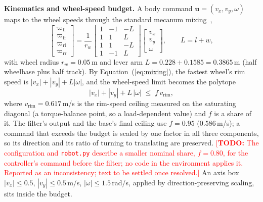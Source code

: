 \documentclass[sensors,article,submit,moreauthors]{Definitions/mdpi}
\newcommand{\todo}[1]{\textcolor{red}{[\textbf{TODO:} #1]}}
\begin{document}
\textbf{Kinematics and wheel-speed budget.} A body command $\mathbf{u} = (v_x, v_y, \omega)$ maps to the wheel speeds through the standard mecanum mixing~\citep{lynch2017modern},
\begin{equation}
\begin{bmatrix}\varpi_{\text{fl}}\\ \varpi_{\text{fr}}\\ \varpi_{\text{rl}}\\ \varpi_{\text{rr}}\end{bmatrix}
= \frac{1}{r_w}
\begin{bmatrix} 1 & -1 & -L\\ 1 & 1 & L\\ 1 & 1 & -L\\ 1 & -1 & L \end{bmatrix}
\begin{bmatrix} v_x\\ v_y\\ \omega\end{bmatrix},
\qquad L = l + w,
\label{eq:mixing}
\end{equation}
with wheel radius $r_w = 0.05$\,m and lever arm $L = 0.228 + 0.1585 = 0.3865$\,m (half wheelbase plus half track). By Equation~(\ref{eq:mixing}), the fastest wheel's rim speed is $|v_x| + |v_y| + L|\omega|$, and the wheel-speed limit becomes the polytope
\begin{equation}
|v_x| + |v_y| + L\,|\omega| \;\le\; f\,v_{\text{rim}},
\label{eq:budget}
\end{equation}
where $v_{\text{rim}} = 0.617$\,m/s is the rim-speed ceiling measured on the saturating diagonal (a torque-balance point, so a load-dependent value) and $f$ is a share of it. The filter's output and the base's final ceiling use $f = 0.95$ ($0.586$\,m/s); a command that exceeds the budget is scaled by one factor in all three components, so its direction and its ratio of turning to translating are preserved. \todo{The configuration and \texttt{robot.py} describe a smaller nominal share, $f = 0.80$, for the controller's command before the filter; no code in the environment applies it. Reported as an inconsistency; text to be settled once resolved.} An axis box $|v_x| \le 0.5$, $|v_y| \le 0.5$\,m/s, $|\omega| \le 1.5$\,rad/s, applied by direction-preserving scaling, sits inside the budget.
\end{document}
